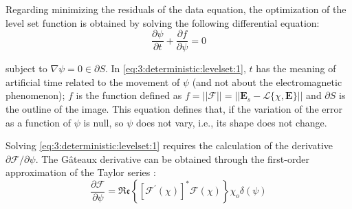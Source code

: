 			Regarding minimizing the residuals of the data equation, the optimization of the level set function is obtained by solving the following differential equation:
			\begin{equation}
				\frac{\partial \psi}{\partial t} + \frac{\partial f}{\partial \psi}=0  \label{eq:3:deterministic:levelset:1}
			\end{equation}
		
			\noindent subject to $\nabla\psi=0\in\partial S$. In \eqref{eq:3:deterministic:levelset:1}, $t$ has the meaning of artificial time related to the movement of $\psi$ (and not about the electromagnetic phenomenon); $f$ is the function defined as $f=||\mathcal{F}|| = || \mathbf{E}_s-\mathcal{L}\{\chi,\mathbf{E}\}||$ and $\partial S$ is the outline of the image. This equation defines that, if the variation of the error as a function of $\psi$ is null, so $\psi$ does not vary, i.e., its shape does not change.
			
			Solving \eqref{eq:3:deterministic:levelset:1} requires the calculation of the derivative $\partial\mathcal{F}/\partial\psi$. The Gâteaux derivative can be obtained through the first-order approximation of the Taylor series \citep{shah2018fast}:
			\begin{equation}
				 \frac{\partial\mathcal{F}}{\partial\psi} = \mathfrak{Re}\left\{[\mathcal{F}^\prime(\chi)]^*\mathcal{F}(\chi)\right\}\chi_o\delta(\psi) \label{eq:3:deterministic:levelset:2}
			\end{equation}
		
